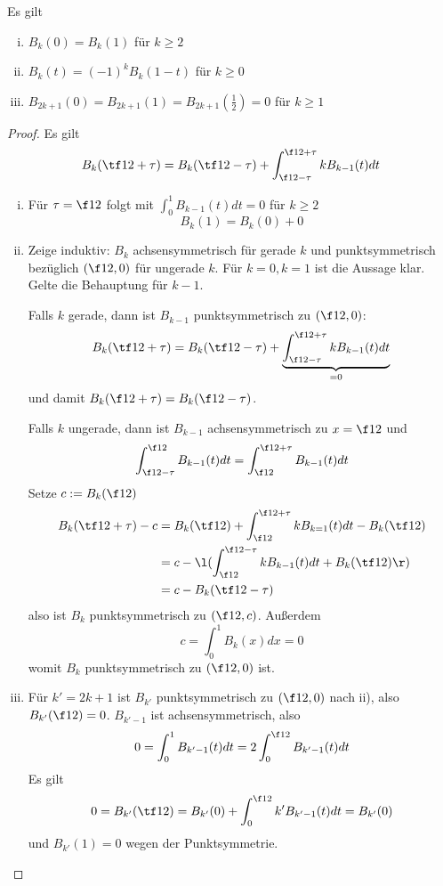 \documentclass[11pt]{scrbook}
\begin{document}
\begin{lem}[Eigenschaften]
	\label{2.35}
	Es gilt
	\begin{enumerate}[i)]
		\item
			$B_k(0) = B_k(1)$ für $k\ge 2$
		\item
			$B_k(t) = (-1)^k B_k(1-t)$ für $k\ge 0$
		\item
			$B_{2k+1}(0) = B_{2k+1}(1) = B_{2k+1}(\frac 12) = 0$ für $k\ge 1$
	\end{enumerate}
	\begin{proof}
		Es gilt
		\[
			B_k (\tf 12 + \tau) = B_k(\tf 12 - \tau)  + \int_{\f 12 - \tau}^{\f 12 + \tau} k B_{k-1}(t) dt
		\]
		\begin{enumerate}[i)]
			\item
				Für $\tau = \f 12$ folgt mit $\int_{0}^1 B_{k-1}(t) dt = 0$ für $k\ge 2$
				\[
					B_k(1) = B_k(0) + 0
				\]
			\item
				Zeige induktiv: $B_k$ achsensymmetrisch für gerade $k$ und punktsymmetrisch bezüglich $(\f 12,0)$ für ungerade $k$.
				Für $k=0, k=1$ ist die Aussage klar.
				Gelte die Behauptung für $k-1$.

				Falls $k$ gerade, dann ist $B_{k-1}$ punktsymmetrisch zu $(\f 12, 0)$:
				\[
					B_k (\tf 12 + \tau) = B_k(\tf 12 - \tau)  + \underbrace{\int_{\f 12 - \tau}^{\f 12 + \tau} k B_{k-1}(t) dt}_{=0}
				\]
				und damit $B_k(\f 12 + \tau) = B_k(\f 12 - \tau)$.

				Falls $k$ ungerade, dann ist $B_{k-1}$ achsensymmetrisch zu $x=\f 12$ und
				\[
					\int_{\f 12 - \tau}^{\f 12} B_{k-1}(t) dt = \int_{\f 12}^{\f 12 + \tau} B_{k-1}(t) dt
				\]
				Setze $c := B_k(\f 12)$
				\begin{align*}
					B_k(\tf 12 + \tau) - c 
					&= B_k (\tf 12) + \int_{\f 12}^{\f 12 + \tau} k B_{k=1}(t) dt - B_k(\tf 12) \\
					&= c - \l( \int_{\f 12}^{\f 12 - \tau} k B_{k-1}(t) dt + B_k( \tf 12) \r) \\
					&= c - B_k(\tf 12 - \tau)
				\end{align*}
				also ist $B_k$ punktsymmetrisch zu $(\f 12, c)$.
				Außerdem
				\[
					c = \int_{0}^1 B_k(x) dx = 0
				\]
				womit $B_k$ punktsymmetrisch zu $(\f 12,0)$ ist.
			\item
				Für $k'=2k+1$ ist $B_{k'}$ punktsymmetrisch zu $(\f 12,0)$ nach ii), also $B_{k'}(\f 12) = 0$.
				$B_{k'-1}$ ist achsensymmetrisch, also
				\[
					0 = \int_0^1 B_{k'-1}(t) dt = 2 \int_0^{\f 12} B_{k'-1} (t) dt 
				\]
				Es gilt
				\[
					0 = B_{k'}(\tf 12) = B_{k'}(0) + \int_{0}^{\f 12} k' B_{k'-1}(t) dt = B_{k'}(0)
				\]
				und $B_{k'}(1) = 0$ wegen der Punktsymmetrie.
		\end{enumerate}
	\end{proof}
\end{lem}
\end{document}
